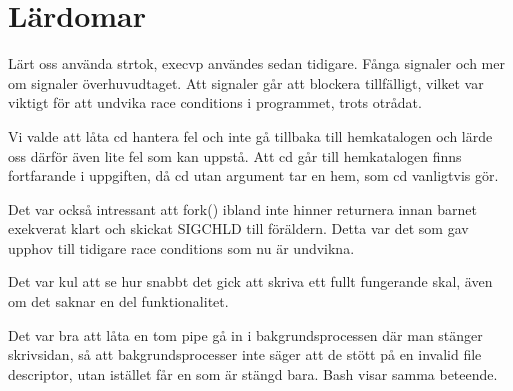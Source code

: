 \documentclass[a4paper,11pt]{article}
\begin{document}
\section*{Lärdomar}

Lärt oss använda strtok, execvp användes sedan tidigare. Fånga signaler och mer om signaler överhuvudtaget. Att signaler går att blockera tillfälligt, vilket var viktigt för att undvika race conditions i programmet, trots otrådat.

Vi valde att låta cd hantera fel och inte gå tillbaka till hemkatalogen och lärde oss därför även lite fel som kan uppstå. Att cd går till hemkatalogen finns fortfarande i uppgiften, då cd utan argument tar en hem, som cd vanligtvis gör.

Det var också intressant att fork() ibland inte hinner returnera innan barnet exekverat klart och skickat SIGCHLD till föräldern. Detta var det som gav upphov till tidigare race conditions som nu är undvikna.

Det var kul att se hur snabbt det gick att skriva ett fullt fungerande skal, även om det saknar en del funktionalitet.

Det var bra att låta en tom pipe gå in i bakgrundsprocessen där man stänger skrivsidan, så att bakgrundsprocesser inte säger att de stött på en invalid file descriptor, utan istället får en som är stängd bara. Bash visar samma beteende.
\end{document}
